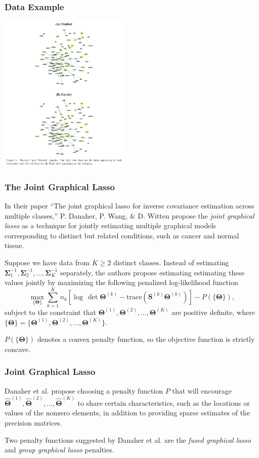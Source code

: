 \documentclass[t]{beamer}
\begin{document}
\begin{frame}
\frametitle{Data Example}
\centering
\includegraphics[height=3in]{guodata2.png}
\end{frame}


\begin{frame}
\frametitle{The Joint Graphical Lasso}
In their paper ``The joint graphical lasso for inverse covariance estimation across multiple classes,''  P. Danaher, P. Wang, \& D. Witten propose the \textit{joint graphical lasso} as a technique for jointly estimating multiple graphical models corresponding to distinct but related conditions, such as cancer and normal tissue.

\bigskip
\pause
Suppose we have data from $K \geq 2$ distinct classes.  Instead of estimating $\bm{\Sigma}_{1}^{-1},\bm{\Sigma}_{2}^{-1},\ldots,\bm{\Sigma}_{K}^{-1}$ separately, the authors propose estimating estimating these values jointly by maximizing the following penalized log-likelihood function
\small
\begin{equation*}
\max_{\{\bm{\Theta}\}} \sum_{k=1}^{K}n_{k}\left[\log\,\det \bm{\Theta}^{(k)}-\mbox{trace}\left(\bm{S}^{(k)}\bm{\Theta}^{(k)}\right)\right] - P(\{\bm{\Theta}\}),
\end{equation*}
\normalsize
subject to the constraint that $\bm{\Theta}^{(1)},\bm{\Theta}^{(2)},\ldots,\bm{\Theta}^{(K)}$ are positive definite, where $\{\bm{\Theta}\} = \{\bm{\Theta}^{(1)},\bm{\Theta}^{(2)},\ldots,\bm{\Theta}^{(K)}\}$.

\bigskip
\pause
$P(\{\bm{\Theta}\})$ denotes a convex penalty function, so the objective function is strictly concave.
\end{frame}

\begin{frame}
\frametitle{Joint Graphical Lasso}
Danaher et al.  propose choosing a penalty function $P$ that will encourage $\hat{\bm{\Theta}}^{(1)},\hat{\bm{\Theta}}^{(2)},\ldots,\hat{\bm{\Theta}}^{(K)}$ to share certain characteristics, such as the locations or values of the nonzero elements, in addition to providing sparse estimates of the precision matrices.

\bigskip
\pause
Two penalty functions suggested by Danaher et al. are the \textit{fused graphical lasso} and \textit{group graphical lasso} penalties.
\end{frame}
\end{document}
